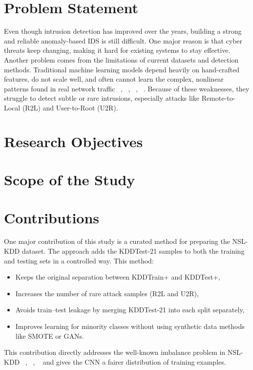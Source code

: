 \lipsum[2]

\section{Problem Statement}

Even though intrusion detection has improved over the years, building a strong and reliable anomaly-based IDS is still difficult. One major reason is that cyber threats keep changing, making it hard for existing systems to stay effective. Another problem comes from the limitations of current datasets and detection methods. Traditional machine learning models depend heavily on hand-crafted features, do not scale well, and often cannot learn the complex, nonlinear patterns found in real network traffic ~\cite{zamani2013machine}, ~\cite{alkasassbeh2018machine}, ~\cite{ramya2020network}, ~\cite{li2018machine}. Because of these weaknesses, they struggle to detect subtle or rare intrusions, especially attacks like Remote-to-Local (R2L) and User-to-Root (U2R).

\lipsum[2]

\section{Research Objectives}

\lipsum[2]

\section{Scope of the Study}

\lipsum[2]


\section{Contributions}

\lipsum[2]

One major contribution of this study is a curated method for preparing the NSL-KDD dataset. The approach adds the KDDTest-21 samples to both the training and testing sets in a controlled way. This method:
\begin{itemize}
\item	Keeps the original separation between KDDTrain+ and KDDTest+,
\item	Increases the number of rare attack samples (R2L and U2R),
\item	Avoids train–test leakage by merging KDDTest-21 into each split separately,
\item	Improves learning for minority classes without using synthetic data methods like SMOTE or GANs.
\end{itemize}
This contribution directly addresses the well-known imbalance problem in NSL-KDD ~\cite{li2017intrusion}, ~\cite{da2019internet}, ~\cite{al2014machine} and gives the CNN a fairer distribution of training examples.




